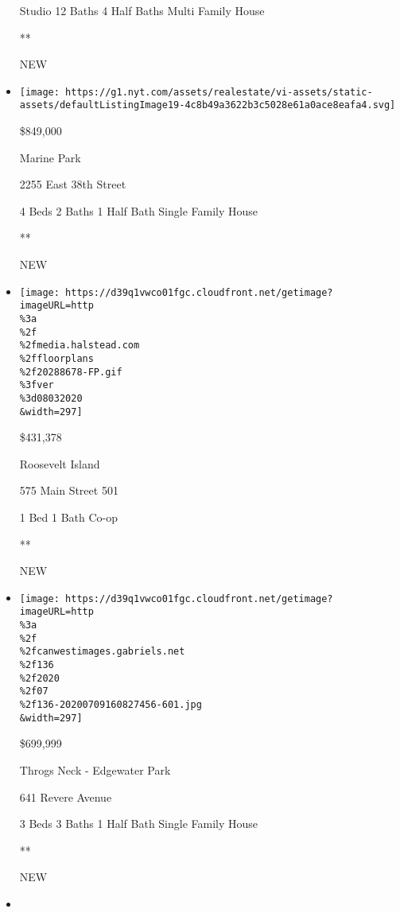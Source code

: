 \begin{itemize}
  Studio \textbar{} 12 Baths \textbar{} 4 Half Baths \textbar{} Multi
  Family House

  **

  NEW
\item
  \href{/real-estate/usa/ny/brooklyn/marine-park/homes-for-sale/2255-east-38th-street/14888-5537978?}{}

  \texttt{[image: https://g1.nyt.com/assets/realestate/vi-assets/static-assets/defaultListingImage19-4c8b49a3622b3c5028e61a0ace8eafa4.svg]}

  \$849,000

  Marine Park

  2255 East 38th Street

  4 Beds \textbar{} 2 Baths \textbar{} 1 Half Bath \textbar{} Single
  Family House

  **

  NEW
\item
  \href{/real-estate/usa/ny/new-york/roosevelt-island/homes-for-sale/575-main-street-501/185-20288678?}{}

  \texttt{[image: https://d39q1vwco01fgc.cloudfront.net/getimage?imageURL=http\\\%3a\\\%2f\\\%2fmedia.halstead.com\\\%2ffloorplans\\\%2f20288678-FP.gif\\\%3fver\\\%3d08032020\\\&width=297]}

  \$431,378

  Roosevelt Island

  575 Main Street 501

  1 Bed \textbar{} 1 Bath \textbar{} Co-op

  **

  NEW
\item
  \href{/real-estate/usa/ny/bronx/throgs-neck---edgewater-park/homes-for-sale/641-revere-avenue/11237-72170695289D4?}{}

  \texttt{[image: https://d39q1vwco01fgc.cloudfront.net/getimage?imageURL=http\\\%3a\\\%2f\\\%2fcanwestimages.gabriels.net\\\%2f136\\\%2f2020\\\%2f07\\\%2f136-20200709160827456-601.jpg\\\&width=297]}

  \$699,999

  Throgs Neck - Edgewater Park

  641 Revere Avenue

  3 Beds \textbar{} 3 Baths \textbar{} 1 Half Bath \textbar{} Single
  Family House

  **

  NEW
\item
  \href{/real-estate/usa/ny/new-york/hells-kitchen/homes-for-sale/450-west-55th-street/12436-OLRS-1891536?}{}


\end{itemize}
